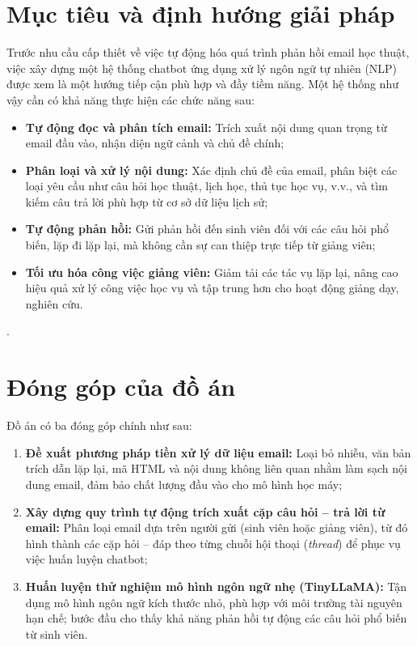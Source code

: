 \documentclass[../DoAn.tex]{subfiles}
\begin{document}
\section{Mục tiêu và định hướng giải pháp}
Trước nhu cầu cấp thiết về việc tự động hóa quá trình phản hồi email học thuật, việc xây dựng một hệ thống chatbot ứng dụng xử lý ngôn ngữ tự nhiên (NLP) được xem là một hướng tiếp cận phù hợp và đầy tiềm năng. Một hệ thống như vậy cần có khả năng thực hiện các chức năng sau:

\begin{itemize}
    \item \textbf{Tự động đọc và phân tích email:} Trích xuất nội dung quan trọng từ email đầu vào, nhận diện ngữ cảnh và chủ đề chính;
    
    \item \textbf{Phân loại và xử lý nội dung:} Xác định chủ đề của email, phân biệt các loại yêu cầu như câu hỏi học thuật, lịch học, thủ tục học vụ, v.v., và tìm kiếm câu trả lời phù hợp từ cơ sở dữ liệu lịch sử;

    \item \textbf{Tự động phản hồi:} Gửi phản hồi đến sinh viên đối với các câu hỏi phổ biến, lặp đi lặp lại, mà không cần sự can thiệp trực tiếp từ giảng viên;

    \item \textbf{Tối ưu hóa công việc giảng viên:} Giảm tải các tác vụ lặp lại, nâng cao hiệu quả xử lý công việc học vụ và tập trung hơn cho hoạt động giảng dạy, nghiên cứu.
\end{itemize}. 

\section{Đóng góp của đồ án}
\label{sec:donggop}

Đồ án có ba đóng góp chính như sau:

\begin{enumerate}
    \item \textbf{Đề xuất phương pháp tiền xử lý dữ liệu email:} Loại bỏ nhiễu, văn bản trích dẫn lặp lại, mã HTML và nội dung không liên quan nhằm làm sạch nội dung email, đảm bảo chất lượng đầu vào cho mô hình học máy;

    \item \textbf{Xây dựng quy trình tự động trích xuất cặp câu hỏi – trả lời từ email:} Phân loại email dựa trên người gửi (sinh viên hoặc giảng viên), từ đó hình thành các cặp hỏi – đáp theo từng chuỗi hội thoại (\textit{thread}) để phục vụ việc huấn luyện chatbot;

    \item \textbf{Huấn luyện thử nghiệm mô hình ngôn ngữ nhẹ (TinyLLaMA):} Tận dụng mô hình ngôn ngữ kích thước nhỏ, phù hợp với môi trường tài nguyên hạn chế; bước đầu cho thấy khả năng phản hồi tự động các câu hỏi phổ biến từ sinh viên.
\end{enumerate}
\end{document}
